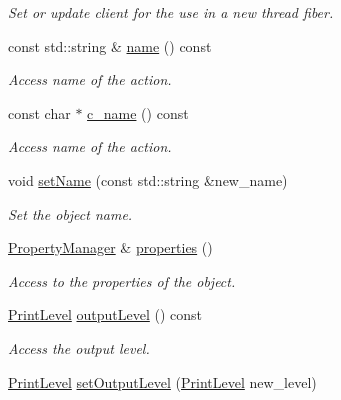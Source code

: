 \begin{DoxyCompactItemize}
\begin{DoxyCompactList}\small\item\em Set or update client for the use in a new thread fiber. \end{DoxyCompactList}\item 
const std\+::string \& \hyperlink{class_d_d4hep_1_1_simulation_1_1_geant4_action_af374e70b014d16afb81dd9d77cc3894b}{name} () const
\begin{DoxyCompactList}\small\item\em Access name of the action. \end{DoxyCompactList}\item 
const char $\ast$ \hyperlink{class_d_d4hep_1_1_simulation_1_1_geant4_action_a7e0ce5a638e716e0e607536a73a85cbf}{c\+\_\+name} () const
\begin{DoxyCompactList}\small\item\em Access name of the action. \end{DoxyCompactList}\item 
void \hyperlink{class_d_d4hep_1_1_simulation_1_1_geant4_action_a88c6c831673b3c152961079507056daa}{set\+Name} (const std\+::string \&new\+\_\+name)
\begin{DoxyCompactList}\small\item\em Set the object name. \end{DoxyCompactList}\item 
\hyperlink{class_d_d4hep_1_1_property_manager}{Property\+Manager} \& \hyperlink{class_d_d4hep_1_1_simulation_1_1_geant4_action_a4159b11cc0acd293357e80980e3ba7d8}{properties} ()
\begin{DoxyCompactList}\small\item\em Access to the properties of the object. \end{DoxyCompactList}\item 
\hyperlink{namespace_d_d4hep_a5b5a64d56252469451f2020a27d57d42}{Print\+Level} \hyperlink{class_d_d4hep_1_1_simulation_1_1_geant4_action_a1de6421e968b3fc53cae8444c6f29b3d}{output\+Level} () const
\begin{DoxyCompactList}\small\item\em Access the output level. \end{DoxyCompactList}\item 
\hyperlink{namespace_d_d4hep_a5b5a64d56252469451f2020a27d57d42}{Print\+Level} \hyperlink{class_d_d4hep_1_1_simulation_1_1_geant4_action_a20453f25c4556d21e25b68f140955cc3}{set\+Output\+Level} (\hyperlink{namespace_d_d4hep_a5b5a64d56252469451f2020a27d57d42}{Print\+Level} new\+\_\+level)

\end{DoxyCompactItemize}
